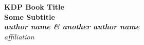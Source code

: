 \documentclass[letterpaper]{kdp}
\begin{document}

\begin{titlepage}
    \color{yellow}
    \centering
    \vspace*{1cm}
    
    \vspace{1cm}
        
    {\fontsize{29pt}{29pt}\selectfont \bfseries KDP Book Title\\\vspace*{0.25cm}Some Subtitle}\\[0.4cm]
    
    \color{white}
    \vspace*{1.5cm}
    \textit{\fontsize{15pt}{15pt}\selectfont \bfseries author name \& another author name}\\
    \vspace*{0.5cm}
    \textit{\fontsize{14pt}{14pt}\selectfont affiliation}
    

    
\end{titlepage}

\clearpage
\tableofcontents
\newpage







\end{document}
